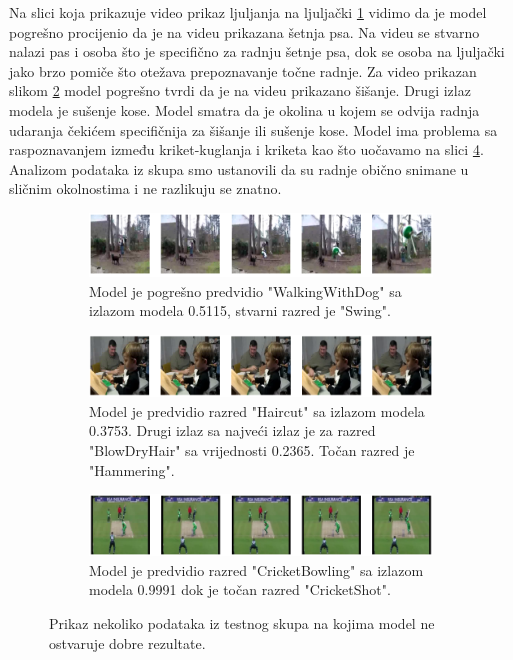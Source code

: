 \documentclass[times, utf8, diplomski,  numeric]{fer}
\begin{document}
\newpage
 Na slici koja prikazuje video prikaz ljuljanja na ljuljački \ref{fig:swing} vidimo da je model pogrešno procijenio da je na videu prikazana šetnja psa. Na videu se stvarno nalazi pas i osoba što je specifično za radnju šetnje psa, dok se osoba na ljuljački jako brzo pomiče što otežava prepoznavanje točne radnje. Za video prikazan slikom \ref{fig:hammering} model pogrešno tvrdi da je na videu prikazano šišanje. Drugi izlaz modela je sušenje kose. Model smatra da je okolina u kojem se odvija radnja udaranja čekićem specifičnija za šišanje ili sušenje kose. Model ima problema sa raspoznavanjem između kriket-kuglanja i kriketa kao što uočavamo na slici \ref{fig:cricket}. Analizom podataka iz skupa smo ustanovili da su radnje obično snimane u sličnim okolnostima i ne razlikuju se znatno. 
\begin{figure}[htp]
\begin{subfigure}{\textwidth}

\centering
\includegraphics[width=\textwidth]{./images/swing}\hfill

\caption{Model je pogrešno predvidio "WalkingWithDog" sa izlazom modela 0.5115, stvarni razred je "Swing".}
\label{fig:swing}
\end{subfigure}

\begin{subfigure}{\textwidth}

\centering
\includegraphics[width=\textwidth]{./images/hammering}\hfill

\caption{Model je predvidio razred "Haircut" sa izlazom modela 0.3753. Drugi izlaz sa najveći izlaz je za razred "BlowDryHair" sa vrijednosti 0.2365. Točan razred je "Hammering".}
\label{fig:hammering}
\end{subfigure}

\begin{subfigure}{\textwidth}

\centering
\includegraphics[width=\textwidth]{./images/cricketshot}\hfill

\caption{Model je predvidio razred "CricketBowling" sa izlazom modela 0.9991 dok je točan razred "CricketShot".}
\label{fig:cricket}
\end{subfigure}
\caption{Prikaz nekoliko podataka iz testnog skupa na kojima model ne ostvaruje dobre rezultate.}
\end{figure}
\end{document}
